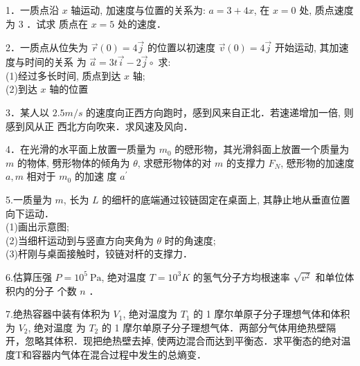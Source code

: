 
1．一质点沿 $x$ 轴运动, 加速度与位置的关系为: $a=3+4 x$, 在 $x=0$ 处, 质点速度为 3 ．试求 质点在 $x=5$ 处的速度．

2．一质点从位失为 $\vec{r}(0)=4 \vec{j}$ 的位置以初速度 $\vec{v}(0)=4 \vec{j}$ 开始运动, 其加速度与时间的关系 为 $\vec{a}=3 t \vec{i}-2 \vec{j} \circ$ 求:\\
(1)经过多长时间, 质点到达 $x$ 轴;\\
(2)到达 $x$ 轴的位置

3．某人以 $2.5 m / s$ 的速度向正西方向跑时，感到风来自正北．若速递增加一倍, 则感到风从正 西北方向吹来．求风速及风向．

4．在光滑的水平面上放置一质量为 $m_{0}$ 的憵形物，其光滑斜面上放置一个质量为 $m$ 的物体, 劈形物体的倾角为 $\theta$, 求憵形物体的对 $m$ 的支撑力 $F_{N}$, 憵形物的加速度 $a, m$ 相对于 $m_{0}$ 的加速 度 $a^{\prime}$

5.一质量为 $m$, 长为 $L$ 的细杆的底端通过铰链固定在桌面上, 其静止地从垂直位置向下运动．\\
(1)画出示意图;\\
(2)当细杆运动到与竖直方向夹角为 $\theta$ 时的角速度;\\
(3)杆刚与桌面接触时，铰链对杆的支撑力．

6.估算压强 $P=10^{5} \mathrm{~Pa}$, 绝对温度 $T=10^{3} K$ 的氢气分子方均根速率 $\sqrt{v^{2}}$ 和单位体积内的分子 个数 $n$ ．

7.绝热容器中装有体积为 $V_{1}$, 绝对温度为 $T_{1}$ 的 1 摩尔单原子分子理想气体和体积为 $V_{2}$, 绝对温度 为 $T_{2}$ 的 1 摩尔单原子分子理想气体．两部分气体用绝热壁隔开，忽略其体积．现把绝热壁去掉, 使两边混合而达到平衡态．求平衡态的绝对温度T和容器内气体在混合过程中发生的总熵变．

